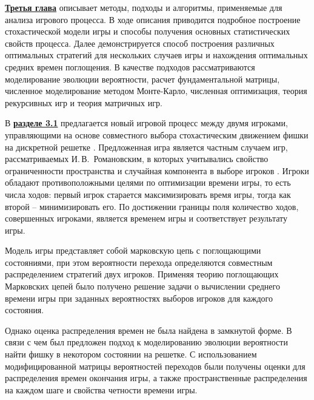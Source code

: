

\underline{\textbf{Третья глава}} описывает методы, подходы и алгоритмы, применяемые для анализа игрового процесса. В ходе описания приводится подробное построение стохастической модели игры и способы получения основных статистических свойств процесса. Далее демонстрируется способ построения различных оптимальных стратегий для нескольких случаев игры и нахождения оптимальных средних времен поглощения. В качестве подходов рассматриваются моделирование эволюции вероятности, расчет фундаментальной матрицы, численное моделирование методом Монте-Карло, численная оптимизация, теория рекурсивных игр и теория матричных игр. 

В \underline{\textbf{разделе 3.1}} предлагается новый игровой процесс между двумя игроками, управляющими на основе совместного выбора стохастическим движением фишки на дискретной решетке \cite{bib3}. Предложенная игра является частным случаем игр, рассматриваемых И.\,В.~Романовским, в которых учитывались свойство ограниченности пространства и случайная компонента в выборе игроков \cite{romanovsky_1961}. Игроки обладают противоположными целями по оптимизации времени игры, то есть числа ходов: первый игрок старается максимизировать время игры, тогда как второй -- минимизировать его. По достижении границы поля количество ходов, совершенных игроками, является временем игры и соответствует результату игры.

Модель игры представляет собой марковскую цепь с поглощающими состояниями, при этом вероятности перехода определяются совместным распределением стратегий двух игроков. Применяя теорию поглощающих Марковских цепей было получено решение задачи о вычислении среднего времени игры при заданных вероятностях выборов игроков для каждого состояния. 

Однако оценка распределения времен не была найдена в замкнутой форме. В связи с чем был предложен подход к моделированию эволюции вероятности найти фишку в некотором состоянии на решетке. С использованием модифицированной матрицы вероятностей переходов были получены оценки для распределения времен окончания игры, а также пространственные распределения на каждом шаге и свойства четности времени игры.

